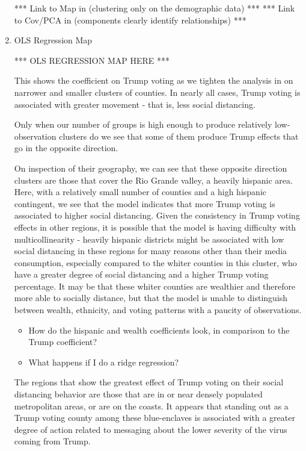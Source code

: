 \documentclass{article}
\begin{document}
\begin{enumerate}
	*** Link to Map in (clustering only on the demographic data) ***
	*** Link to Cov/PCA in (components clearly identify relationships) ***
	
	
	\item OLS Regression Map
	
	*** OLS REGRESSION MAP HERE ***

	This shows the coefficient on Trump voting as we tighten the analysis in on narrower and smaller clusters of counties. In nearly all cases, Trump voting is associated with greater movement - that is, less social distancing. 
		
	Only when our number of groups is high enough to produce relatively low-observation clusters do we see that some of them produce Trump effects that go in the opposite direction.
		
	On inspection of their geography, we can see that these opposite direction clusters are those that cover the Rio Grande valley, a heavily hispanic area. Here, with a relatively small number of counties and a high hispanic contingent, we see that the model indicates that more Trump voting is associated to higher social distancing. Given the consistency in Trump voting effects in other regions, it is possible that the model is having difficulty with multicollinearity - heavily hispanic districts might be associated with low social distancing in these regions for many reasons other than their media consumption, especially compared to the whiter counties in this cluster, who have a greater degree of social distancing and a higher Trump voting percentage. It may be that these whiter counties are wealthier and therefore more able to socially distance, but that the model is unable to distinguish between wealth, ethnicity, and voting patterns with a paucity of observations.
	
		\begin{itemize}
			\item How do the hispanic and wealth coefficients look, in comparison to the Trump coefficient?
			\item What happens if I do a ridge regression?
		\end{itemize}
	
	The regions that show the greatest effect of Trump voting on their social distancing behavior are those that are in or near densely populated metropolitan areas, or are on the coasts. It appears that standing out as a Trump voting county among these blue-enclaves is associated with a greater degree of action related to messaging about the lower severity of the virus coming from Trump.
	

\end{enumerate}
\end{document}
